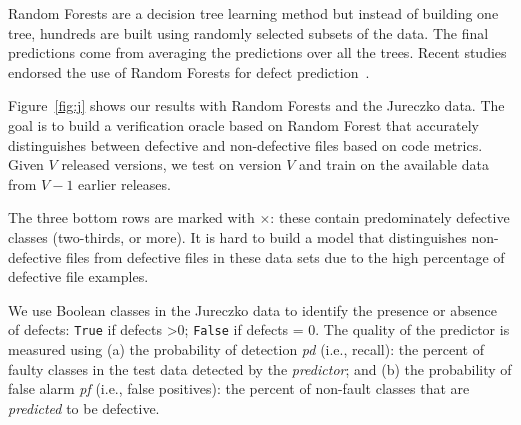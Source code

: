 \documentclass[twocolumn,5p]{elsarticle}
\newcommand{\fig}[1]{Figure~\ref{fig:#1}}
\theoremstyle{break}
\begin{document}
	Random Forests are a decision tree learning method but
	instead of building one tree, hundreds are built using
	randomly selected subsets of the data. The final predictions
	come from averaging the predictions over all the trees.
	Recent studies endorsed the use
	of  Random Forests for  defect prediction~\cite{lessmann}.
	
	\fig{j} shows  our results with Random Forests and
	the Jureczko data. The goal is to build a verification oracle based on 
	Random Forest that accurately distinguishes between defective and 
	non-defective files based on code metrics. Given $V$ released versions, we 
	test on version $V$ and train on the available data from $V-1$ earlier 
	releases. 
	
	The \colorbox{lavenderpink}{three bottom rows}  are marked 
	with $\times$: these contain predominately defective classes (two-thirds, 
	or more).  It is hard to build a model that distinguishes non-defective 
	files from defective files in these data sets due to the high percentage of 
	defective file examples.
	
	We use Boolean classes in the  Jureczko data to identify the presence or 
	absence of defects: \texttt{True} if defects \textgreater 0; \texttt{False} 
	if defects = 0. The quality of the predictor is measured using (a) the  
	probability of detection \textit{pd} (i.e., recall):  the percent of faulty 
	classes in the test data detected by the {\em predictor}; and (b) the  
	probability of false alarm \textit{pf} (i.e., false positives): the percent 
	of non-fault classes that are {\em predicted} to be defective.
	
\end{document}
